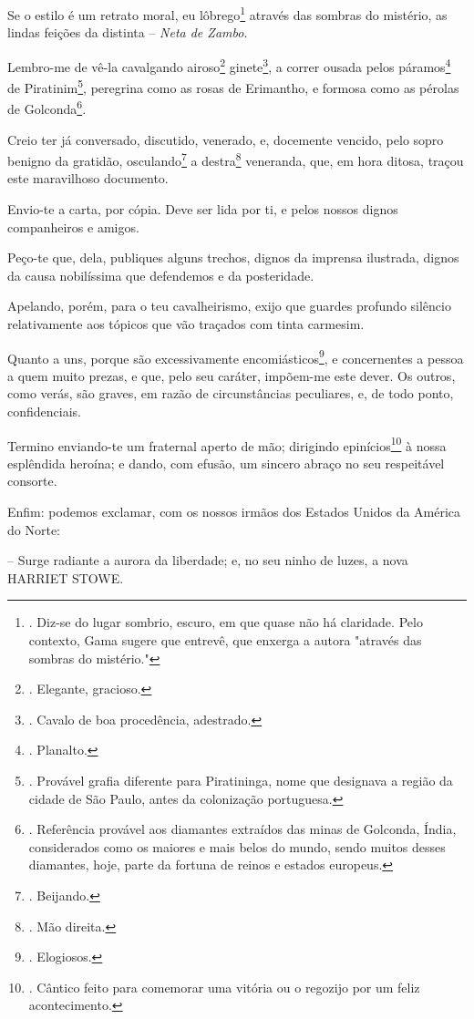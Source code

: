 Se o estilo é um retrato moral, eu lôbrego\footnote{. Diz-se do lugar
  sombrio, escuro, em que quase não há claridade. Pelo contexto, Gama
  sugere que entrevê, que enxerga a autora "através das sombras do
  mistério."} através das sombras do mistério, as lindas feições da
distinta -- \emph{Neta de Zambo}.

Lembro-me de vê-la cavalgando airoso\footnote{. Elegante, gracioso.}
ginete\footnote{. Cavalo de boa procedência, adestrado.}, a correr
ousada pelos páramos\footnote{. Planalto.} de Piratinim\footnote{.
  Provável grafia diferente para Piratininga, nome que designava a
  região da cidade de São Paulo, antes da colonização portuguesa.},
peregrina como as rosas de Erimantho, e formosa como as pérolas de
Golconda\footnote{. Referência provável aos diamantes extraídos das
  minas de Golconda, Índia, considerados como os maiores e mais belos do
  mundo, sendo muitos desses diamantes, hoje, parte da fortuna de reinos
  e estados europeus.}.

Creio ter já conversado, discutido, venerado, e, docemente vencido, pelo
sopro benigno da gratidão, osculando\footnote{. Beijando.} a
destra\footnote{. Mão direita.} veneranda, que, em hora ditosa, traçou
este maravilhoso documento.

Envio-te a carta, por cópia. Deve ser lida por ti, e pelos nossos dignos
companheiros e amigos.

Peço-te que, dela, publiques alguns trechos, dignos da imprensa
ilustrada, dignos da causa nobilíssima que defendemos e da posteridade.

Apelando, porém, para o teu cavalheirismo, exijo que guardes profundo
silêncio relativamente aos tópicos que vão traçados com tinta carmesim.

Quanto a uns, porque são excessivamente encomiásticos\footnote{.
  Elogiosos.}, e concernentes a pessoa a quem muito prezas, e que, pelo
seu caráter, impõem-me este dever. Os outros, como verás, são graves, em
razão de circunstâncias peculiares, e, de todo ponto, confidenciais.

Termino enviando-te um fraternal aperto de mão; dirigindo
epinícios\footnote{. Cântico feito para comemorar uma vitória ou o
  regozijo por um feliz acontecimento.} à nossa esplêndida heroína; e
dando, com efusão, um sincero abraço no seu respeitável consorte.

Enfim: podemos exclamar, com os nossos irmãos dos Estados Unidos da
América do Norte:

-- Surge radiante a aurora da liberdade; e, no seu ninho de luzes, a
nova HARRIET STOWE.

